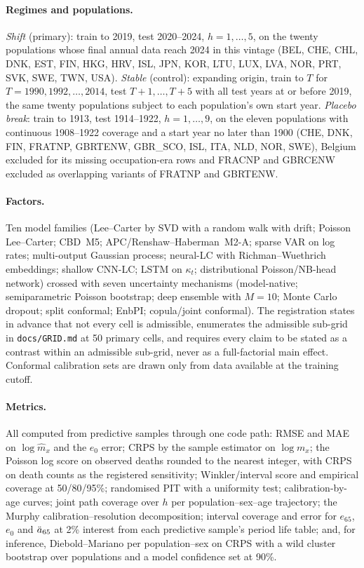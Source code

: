 \paragraph{Regimes and populations.} \emph{Shift} (primary): train to 2019,
test 2020--2024, $h=1,\dots,5$, on the twenty populations whose final annual
data reach 2024 in this vintage (BEL, CHE, CHL, DNK, EST, FIN, HKG, HRV, ISL,
JPN, KOR, LTU, LUX, LVA, NOR, PRT, SVK, SWE, TWN, USA). \emph{Stable}
(control): expanding origin, train to $T$ for $T=1990,1992,\dots,2014$, test
$T+1,\dots,T+5$ with all test years at or before 2019, the same twenty
populations subject to each population's own start year. \emph{Placebo
break}: train to 1913, test 1914--1922, $h=1,\dots,9$, on the eleven
populations with continuous 1908--1922 coverage and a start year no later
than 1900 (CHE, DNK, FIN, FRATNP, GBRTENW, GBR\_SCO, ISL, ITA, NLD, NOR,
SWE), Belgium excluded for its missing occupation-era rows and FRACNP and
GBRCENW excluded as overlapping variants of FRATNP and GBRTENW.

\paragraph{Factors.} Ten model families (Lee--Carter by SVD with a random
walk with drift; Poisson Lee--Carter; CBD~M5; APC/Renshaw--Haberman~M2-A;
sparse VAR on log rates; multi-output Gaussian process; neural-LC with
Richman--Wuethrich embeddings; shallow CNN-LC; LSTM on $\kappa_t$;
distributional Poisson/NB-head network) crossed with seven uncertainty
mechanisms (model-native; semiparametric Poisson bootstrap; deep ensemble
with $M=10$; Monte Carlo dropout; split conformal; EnbPI; copula/joint
conformal). The registration states in advance that not every cell is
admissible, enumerates the admissible sub-grid in \texttt{docs/GRID.md} at 50
primary cells, and requires every claim to be stated as a contrast within an
admissible sub-grid, never as a full-factorial main effect. Conformal
calibration sets are drawn only from data available at the training cutoff.

\paragraph{Metrics.} All computed from predictive samples through one code
path: RMSE and MAE on $\log \hat m_x$ and the $e_0$ error; CRPS by the sample
estimator on $\log m_x$; the Poisson log score on observed deaths rounded to
the nearest integer, with CRPS on death counts as the registered sensitivity;
Winkler/interval score and empirical coverage at 50/80/95\%; randomised PIT
with a uniformity test; calibration-by-age curves; joint path coverage over
$h$ per population--sex--age trajectory; the Murphy
calibration--resolution decomposition; interval coverage and error for
$e_{65}$, $e_0$ and $\ddot{a}_{65}$ at 2\% interest from each predictive sample's
period life table; and, for inference, Diebold--Mariano per population--sex on
CRPS with a wild cluster bootstrap over populations and a model confidence
set at 90\%.

